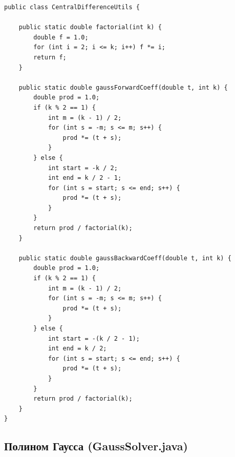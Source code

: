 \begin{lstlisting}[style=javaStyle, label=code:cdutil]
public class CentralDifferenceUtils {

    public static double factorial(int k) {
        double f = 1.0;
        for (int i = 2; i <= k; i++) f *= i;
        return f;
    }

    public static double gaussForwardCoeff(double t, int k) {
        double prod = 1.0;
        if (k % 2 == 1) {
            int m = (k - 1) / 2;
            for (int s = -m; s <= m; s++) {
                prod *= (t + s);
            }
        } else {
            int start = -k / 2;
            int end = k / 2 - 1;
            for (int s = start; s <= end; s++) {
                prod *= (t + s);
            }
        }
        return prod / factorial(k);
    }

    public static double gaussBackwardCoeff(double t, int k) {
        double prod = 1.0;
        if (k % 2 == 1) {
            int m = (k - 1) / 2;
            for (int s = -m; s <= m; s++) {
                prod *= (t + s);
            }
        } else {
            int start = -(k / 2 - 1);
            int end = k / 2;
            for (int s = start; s <= end; s++) {
                prod *= (t + s);
            }
        }
        return prod / factorial(k);
    }
}
\end{lstlisting}

\subsection{Полином Гаусса (GaussSolver.java)}


